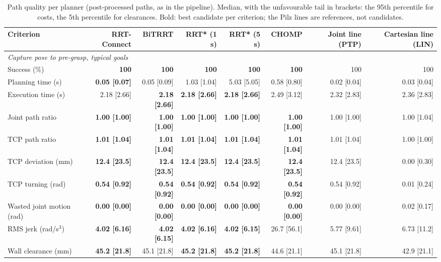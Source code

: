 \begin{table}[t]
\centering
\scriptsize
\caption{Path quality per planner (post-processed paths, as in the pipeline). Median, with the unfavourable tail in brackets: the 95th percentile for costs, the 5th percentile for clearances. Bold: best candidate per criterion; the Pilz lines are references, not candidates.}
\label{tab:planner_quality}
\setlength{\tabcolsep}{3pt}
\begin{tabular}{lrrrrrrr}
\toprule
Criterion & RRT-Connect & BiTRRT & RRT* (1 s) & RRT* (5 s) & CHOMP & Joint line (PTP) & Cartesian line (LIN) \\
\midrule
\multicolumn{8}{l}{\emph{Capture pose to pre-grasp, typical goals}} \\
Success (\%) & \textbf{100} & \textbf{100} & \textbf{100} & \textbf{100} & \textbf{100} & 100 & 100 \\
Planning time (s) & \textbf{0.05 [0.07]} & 0.05 [0.09] & 1.03 [1.04] & 5.03 [5.05] & 0.58 [0.80] & 0.02 [0.04] & 0.03 [0.04] \\
Execution time (s) & 2.18 [2.66] & \textbf{2.18 [2.66]} & \textbf{2.18 [2.66]} & \textbf{2.18 [2.66]} & 2.49 [3.12] & 2.32 [2.83] & 2.36 [2.83] \\
Joint path ratio & \textbf{1.00 [1.00]} & \textbf{1.00 [1.00]} & \textbf{1.00 [1.00]} & \textbf{1.00 [1.00]} & \textbf{1.00 [1.00]} & 1.00 [1.00] & 1.00 [1.04] \\
TCP path ratio & \textbf{1.01 [1.04]} & \textbf{1.01 [1.04]} & \textbf{1.01 [1.04]} & \textbf{1.01 [1.04]} & \textbf{1.01 [1.04]} & 1.01 [1.04] & 1.00 [1.00] \\
TCP deviation (mm) & \textbf{12.4 [23.5]} & \textbf{12.4 [23.5]} & \textbf{12.4 [23.5]} & \textbf{12.4 [23.5]} & \textbf{12.4 [23.5]} & 12.4 [23.5] & 0.00 [0.30] \\
TCP turning (rad) & \textbf{0.54 [0.92]} & \textbf{0.54 [0.92]} & \textbf{0.54 [0.92]} & \textbf{0.54 [0.92]} & \textbf{0.54 [0.92]} & 0.54 [0.92] & 0.01 [0.24] \\
Wasted joint motion (rad) & \textbf{0.00 [0.00]} & \textbf{0.00 [0.00]} & \textbf{0.00 [0.00]} & \textbf{0.00 [0.00]} & \textbf{0.00 [0.00]} & 0.00 [0.00] & 0.02 [0.17] \\
RMS jerk (rad/s$^3$) & \textbf{4.02 [6.16]} & \textbf{4.02 [6.15]} & \textbf{4.02 [6.16]} & \textbf{4.02 [6.15]} & 26.7 [56.1] & 5.77 [9.61] & 6.73 [11.2] \\
Wall clearance (mm) & \textbf{45.2 [21.8]} & 45.1 [21.8] & \textbf{45.2 [21.8]} & \textbf{45.2 [21.8]} & 44.6 [21.1] & 45.1 [21.8] & 42.9 [21.1] \\

\end{tabular}
\end{table}

